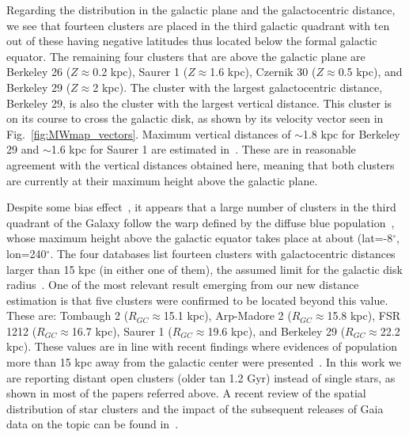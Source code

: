 \documentclass{aa}
\begin{document}
  Regarding the distribution in the galactic plane and the galactocentric
  distance, we see that fourteen clusters are placed in the third galactic
  quadrant with ten out of these having negative latitudes thus located below
  the formal galactic equator. The remaining four clusters that are above the
  galactic plane are Berkeley 26 ($Z\approx$0.2 kpc), Saurer 1
  ($Z\approx$1.6 kpc), Czernik 30 ($Z\approx$0.5 kpc), and Berkeley
  29 ($Z\approx$2 kpc). The cluster with the largest galactocentric distance,
  Berkeley 29, is also the cluster with the largest vertical distance. This
  cluster is on its course to cross the galactic disk, as shown by its velocity
  vector seen in Fig.~\ref{fig:MWmap_vectors}. Maximum vertical distances
  of $\sim$1.8 kpc for Berkeley 29 and $\sim$1.6 kpc for Saurer 1 are estimated
  in~\cite{Gaia_Collaboration_2021}. These are in reasonable agreement with the
  vertical distances obtained here, meaning that both clusters are currently at
  their maximum height above the galactic plane.

  Despite some bias effect~\citep[e.g. lower dust absorption, particularly
  along the Fitzgerald window][]{Fitzgerald_1968}, it appears that a large
  number of clusters in the third quadrant of the Galaxy follow the warp defined
  by the diffuse blue population~\citep{Carraro_2005_detection,Moitinho_2006},
  whose maximum height above the galactic equator takes place at about
  (lat=-8$^{\circ}$, lon=240$^{\circ}$.
  The four databases list fourteen clusters with galactocentric distances larger
  than 15 kpc (in either one of them), the assumed limit for the galactic disk
  radius~\citep[see][and references therein]{Carraro_2010}.
  One of the most relevant result emerging from our new distance estimation is
  that five clusters were confirmed to be located beyond this value.
  These are: Tombaugh 2 ($R_{GC}\approx$15.1 kpc), Arp-Madore 2
  ($R_{GC}\approx$15.8 kpc), FSR 1212 ($R_{GC}\approx$16.7 kpc), Saurer 1
  ($R_{GC}\approx$19.6 kpc), and Berkeley 29 ($R_{GC}\approx$22.2 kpc). These
  values are in line with recent findings where evidences of population more than
  15 kpc away from the galactic center were presented~\citep[][and references
  therein]{Liu_2017,Lopez_2018}.
  In this work we are reporting distant open clusters (older tan 1.2 Gyr)
  instead of single stars, as shown in most of the papers referred above.
  A recent review of the spatial distribution of star clusters and
  the impact of the subsequent releases of Gaia data on the topic can be found
  in~\cite{Cantat-Gaudin_2022}.\\
\end{document}

